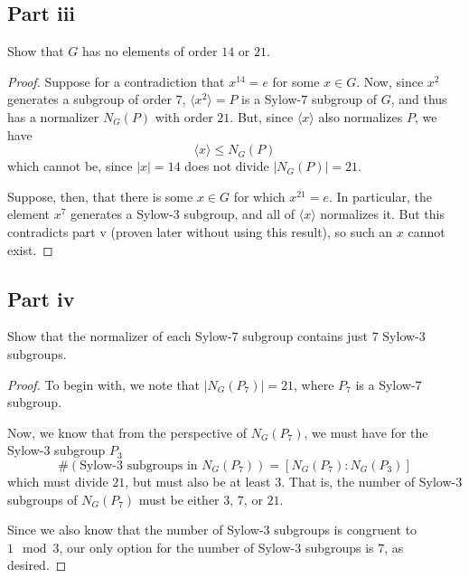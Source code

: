 \documentclass[12pt,reqno]{amsart}
\begin{document}
\subsection*{Part iii}
Show that $G$ has no elements of order $14$ or $21$.
\\
\begin{proof}
    Suppose for a contradiction that $x^{14} = e$ for some $x\in G$.
    Now, since $x^2$ generates a subgroup of order $7$, $\langle x^2\rangle = P$
    is a Sylow-$7$ subgroup of $G$, and thus has a normalizer $N_G(P)$ with
    order $21$. But, since $\langle x\rangle$ also normalizes $P$, we have
    \[
        \langle x\rangle \leq N_G(P)
    \]
    which cannot be, since $|x|=14$ does not divide $|N_G(P)| = 21$.

    Suppose, then, that there is some $x\in G$ for which $x^{21}=e$. In
    particular, the element $x^7$ generates a Sylow-$3$ subgroup, and all of
    $\langle x\rangle$ normalizes it. But this contradicts part v (proven
    later without using this result), so such an $x$ cannot exist.
\end{proof}

\subsection*{Part iv}
Show that the normalizer of each Sylow-$7$ subgroup contains just $7$ Sylow-$3$
subgroups.
\\
\begin{proof}
    To begin with, we note that $|N_G(P_7)|=21$, where $P_7$ is a Sylow-$7$
    subgroup.

    Now, we know that from the perspective of $N_G(P_7)$, we must have for the
    Sylow-$3$ subgroup $P_3$
    \[
        \#(\textrm{Sylow-3 subgroups in $N_G(P_7)$}) = [N_G(P_7):N_G(P_3)]
    \]
    which must divide $21$, but must also be at least $3$. That is, the number
    of Sylow-$3$ subgroups of $N_G(P_7)$ must be either $3$, $7$, or $21$.

    Since we also know that the number of Sylow-$3$ subgroups is congruent
    to $1\mod 3$, our only option for the number of Sylow-$3$ subgroups is $7$,
    as desired.
\end{proof}
\end{document}
